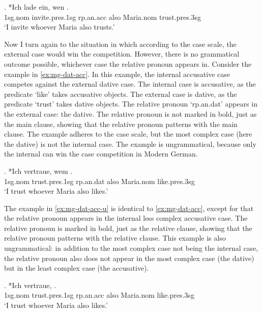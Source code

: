 \exg. *Ich {lade ein}, wen   . \\
1\ac{sg}.\ac{nom} invite.\ac{pres}.1\ac{sg}\scsub{[acc]} \ac{rp}.\ac{an}.\ac{acc} also Maria.\ac{nom} trust.\ac{pres}.3\ac{sg}\scsub{[dat]}\\
`I invite whoever Maria also trusts.' \label{ex:mg-acc-dat-u}

Now I turn again to the situation in which according to the case scale, the external case would win the competition. However, there is no grammatical outcome possible, whichever case the relative pronoun appears in.
Consider the example in \ref{ex:mg-dat-acc}. In this example, the internal accusative case competes against the external dative case.
The internal case is accusative, as the predicate  `like' takes accusative objects.
The external case is dative, as the predicate  `trust' takes dative objects.
The relative pronoun  `\ac{rp}.\ac{an}.\ac{dat}' appears in the external case: the dative. The relative pronoun is not marked in bold, just as the main clause, showing that the relative pronoun patterns with the main clause.
The example adheres to the case scale, but the most complex case (here the dative) is not the internal case. The example is ungrammatical, because only the internal can win the case competition in Modern German.

\exg. *Ich vertraue, wem   . \\
1\ac{sg}.\ac{nom} trust.\ac{pres}.1\ac{sg}\scsub{[dat]} \ac{rp}.\ac{an}.\ac{dat} also Maria.\ac{nom} like.\ac{pres}.3\ac{sg}\scsub{[acc]}\\
`I trust whoever Maria also likes.' \label{ex:mg-dat-acc}

The example in \ref{ex:mg-dat-acc-u} is identical to \ref{ex:mg-dat-acc}, except for that the relative pronoun appears in the internal less complex accusative case.
The relative pronoun is marked in bold, just as the relative clause, showing that the relative pronoun patterns with the relative clause.
This example is also ungrammatical: in addition to the most complex case not being the internal case, the relative pronoun also does not appear in the most complex case (the dative) but in the least complex case (the accusative).

\exg. *Ich vertraue,    . \\
1\ac{sg}.\ac{nom} trust.\ac{pres}.1\ac{sg}\scsub{[dat]} \ac{rp}.\ac{an}.\ac{acc} also Maria.\ac{nom} like.\ac{pres}.3\ac{sg}\scsub{[acc]}\\
`I trust whoever Maria also likes.' \label{ex:mg-dat-acc-u}

